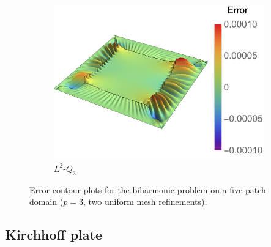 \begin{figure}
\begin{subfigure}[t]{.45\linewidth}
		\includegraphics[scale=.52]{five_patch_biharmonic_L2_contour}
		\caption{$L^2$-$Q_3$}
	\end{subfigure}
	\caption{Error contour plots for the biharmonic problem on a five-patch domain ($p=3$, two uniform mesh refinements). }\label{fig:contour_biharmonic}
\end{figure}

\subsection{Kirchhoff plate}\label{sec:kl-plate_problem}

